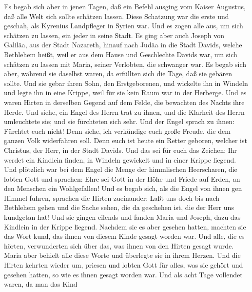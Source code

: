  Es begab sich aber in jenen Tagen, daß ein Befehl ausging
vom Kaiser Augustus, daß alle Welt sich sollte schätzen lassen.
 Diese Schatzung war die erste und geschah, als Kyrenius
Landpfleger in Syrien war.  Und es zogen alle aus, um sich
schätzen zu lassen, ein jeder in seine Stadt.  Es ging
aber auch Joseph von Galiläa, aus der Stadt Nazareth, hinauf nach Judäa
in die Stadt Davids, welche Bethlehem heißt, weil er aus dem Hause und
Geschlechte Davids war,  um sich schätzen zu lassen mit
Maria, seiner Verlobten, die schwanger war.  Es begab sich
aber, während sie daselbst waren, da erfüllten sich die Tage, daß sie
gebären sollte.  Und sie gebar ihren Sohn, den
Erstgeborenen, und wickelte ihn in Windeln und legte ihn in eine Krippe,
weil für sie kein Raum war in der Herberge.  Und es waren
Hirten in derselben Gegend auf dem Felde, die bewachten des Nachts ihre
Herde.  Und siehe, ein Engel des Herrn trat zu ihnen, und
die Klarheit des Herrn umleuchtete sie; und sie fürchteten sich sehr.
 Und der Engel sprach zu ihnen: Fürchtet euch nicht! Denn
siehe, ich verkündige euch große Freude, die dem ganzen Volk widerfahren
soll.  Denn euch ist heute ein Retter geboren, welcher
ist Christus, der Herr, in der Stadt Davids.  Und das sei
für euch das Zeichen: Ihr werdet ein Kindlein finden, in Windeln
gewickelt und in einer Krippe liegend.  Und plötzlich war
bei dem Engel die Menge der himmlischen Heerscharen, die lobten Gott und
sprachen:  Ehre sei Gott in der Höhe und Friede auf
Erden, an den Menschen ein Wohlgefallen!  Und es begab
sich, als die Engel von ihnen gen Himmel fuhren, sprachen die Hirten
zueinander: Laßt uns doch bis nach Bethlehem gehen und die Sache sehen,
die da geschehen ist, die der Herr uns kundgetan hat! 
Und sie gingen eilends und fanden Maria und Joseph, dazu das Kindlein in
der Krippe liegend.  Nachdem sie es aber gesehen hatten,
machten sie das Wort kund, das ihnen von diesem Kinde gesagt worden war.
 Und alle, die es hörten, verwunderten sich über das, was
ihnen von den Hirten gesagt wurde.  Maria aber behielt
alle diese Worte und überlegte sie in ihrem Herzen.  Und
die Hirten kehrten wieder um, priesen und lobten Gott für alles, was sie
gehört und gesehen hatten, so wie es ihnen gesagt worden war.
 Und als acht Tage vollendet waren, da man das Kind
